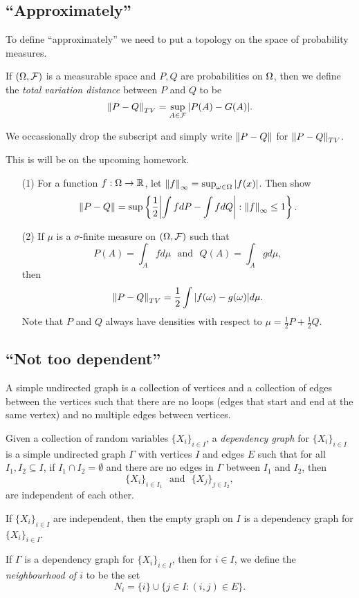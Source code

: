 \subsection{``Approximately''}
To define ``approximately'' we need to put a topology on the space of probability measures.
\begin{defn}
    If $({{\Omega}}, {\mathcal{F}})$ is a measurable space and $P,Q$ are probabilities on ${{\Omega}}$, then we define the \emph{total variation distance} between $P$ and $Q$ to be 
    \[\left\|P-Q\right\|_{TV} = \sup_{A \in {\mathcal{F}}}{\left\lvert P(A)-G(A)\right\rvert}. \]
\end{defn}
We occassionally drop the subscript and simply write $\left\|P-Q\right\|$ for $\left\|P-Q\right\|_{TV}$.
\begin{exer}
    This is will be on the upcoming homework. 
    \begin{enumerate}
        \item[(1)] For a function $f : {{\Omega}} \to {\mathbb R}$, let $\left\|f\right\|_\infty = \sup_{{\omega} \in {{\Omega}}} {\left\lvert f(x)\right\rvert}$. Then show \[\left\|P-Q\right\| = \sup \left\{\frac{1}{2}{\left\lvert\int f dP - \int f dQ\right\rvert}: \left\|f\right\|_\infty \le 1\right\}.\]
        \item[(2)] If $\mu$ is a $\sigma$-finite measure on $({{\Omega}},{\mathcal{F}})$ such that 
        \[P(A) = \int_A fd\mu ~~~\text{and}~~~ Q(A) = \int_A g d\mu, \]
        then 
        \[\left\|P-Q\right\|_{TV} = \frac{1}{2}\int{\left\lvert f({\omega})-g({\omega})\right\rvert}d\mu. \] 
        Note that $P$ and $Q$ always have densities with respect to $\mu = \frac{1}{2}P+\frac{1}{2}Q$.
    \end{enumerate}
\end{exer}
\subsection{``Not too dependent''}
A simple undirected graph is a collection of vertices and a collection of edges between the vertices such that there are no loops (edges that start and end at the same vertex) and no multiple edges between vertices.
\begin{defn}
    Given a collection of random variables $\{X_i\}_{i \in I}$, a \emph{dependency graph} for $\{X_i\}_{i \in I}$ is a simple undirected graph $\Gamma$ with vertices $I$ and edges $E$ such that for all $I_1,I_2 \subseteq I$, if $I_1 \cap I_2 = \emptyset$ and there are no edges in $\Gamma$ between $I_1$ and $I_2$, then 
    \[\{X_i\}_{i \in I_1} ~~~\text{and}~~~\{X_j\}_{j \in I_2}, \]
    are independent of each other.
\end{defn}
\begin{ex}
    If $\{X_i\}_{i \in I}$ are independent, then the empty graph on $I$ is a dependency graph for $\{X_i\}_{i \in I}$.
\end{ex}
\begin{defn}
    If $\Gamma$ is a dependency graph for $\{X_i\}_{i \in I}$, then for $i \in I$, we define the \emph{neighbourhood of $i$} to be the set 
    \[N_i = \{i\} \cup \{j \in I: (i,j) \in E\}. \]
\end{defn}
